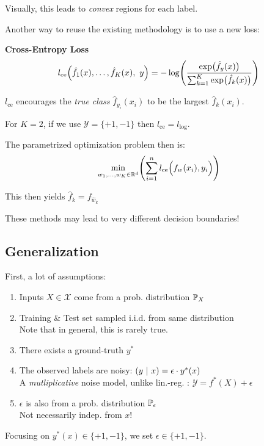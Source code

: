 {\footnotesize
    \remark Visually, this leads to \textit{convex} regions for each label.
}

Another way to reuse the existing methodology is to use a new loss:

 \textbf{Cross-Entropy Loss}
$$
    l_\text{ce}\Bigl( \hat{f}_1(x),\ldots,\hat{f}_K(x),\ y \Bigr) = -\log\Biggl( \frac{\exp\bigl(\hat{f}_y(x)\bigr)}{\sum_{k=1}^{K}\exp\bigl( \hat{f}_k(x) \bigr)} \Biggr)
$$

$l_\text{ce}$ encourages the \textit{true class} $\hat{f}_{y_i}(x_i)$ to be the largest $\hat{f}_k(x_i)$.

{\scriptsize
    \remark For $K=2$, if we use $\mathcal{Y}=\{+1,-1\}$ then $l_\text{ce} = l_\text{log}$.
}

The parametrized optimization problem then is:
$$
    \underset{w_1,\ldots,w_K \in \R^d}{\min}\Biggl( \sum_{i=1}^{n} l_\text{ce}\Bigl( f_w(x_i), y_i \Bigr) \Biggr)
$$

This then yields $\hat{f}_k = f_{\hat{w}_k}$

{\scriptsize
    \remark These methods may lead to very different decision boundaries!
}

\newpage
\subsection{Generalization}

First, a lot of assumptions:
{\small
    \begin{enumerate}
        \item Inputs $X \in \mathcal{X}$ come from a prob. distribution $\P_X$
        \item Training \& Test set sampled i.i.d. from same distribution\\
        {\color{gray} Note that in general, this is rarely true.}
        \item There exists a ground-truth $y^*$
        \item The observed labels are noisy: $(y \sep x) = \epsilon\cdot y^*(x)$\\
        {\color{gray}\scriptsize A \textit{mutliplicative} noise model, unlike lin.-reg. : $\mathcal{Y} = f^*(X) + \epsilon$}
        \item $\epsilon$ is also from a prob. distribution $\P_\epsilon$\\
        {\color{gray} Not necessarily indep. from $x$!}
    \end{enumerate}
}
Focusing on $y^*(x) \in \{+1,-1\}$, we set $\epsilon \in \{+1,-1\}$.\\

